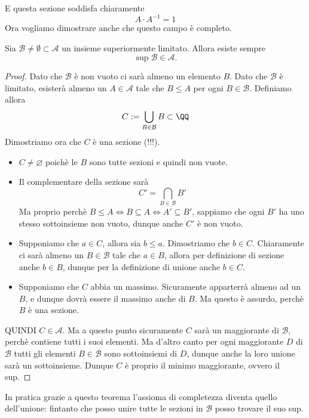 \documentclass[11pt]{scrartcl}
\newcommand{\eset}{\varnothing}
\begin{document}
	E questa sezione soddisfa chiaramente 
	$$A\cdot A^{-1}=1$$
	Ora vogliamo dimostrare anche che questo campo è completo. 
	\begin{theorem}
		Sia $\mathcal{B}\ne\emptyset\subset\mathcal{A}$ un insieme superiormente limitato. Allora esiste sempre $$\sup\mathcal{B}\in\mathcal{A}.$$
	\end{theorem}
	\begin{proof}
		Dato che $\mathcal{B}$ è non vuoto ci sarà almeno un elemento $B$. Dato che $\mathcal{B}$ è limitato, esisterà almeno un $A\in\mathcal{A}$ tale che $B\le A$ per ogni $B\in\mathcal{B}$. Definiamo allora
		$$C:=\bigcup_{B\in\mathcal{B}}B\subset \QQ$$
		Dimostriamo ora che $C$ è una sezione (!!!).
		\begin{itemize}
			\item $C\ne \eset$ poichè le $B$ sono tutte sezioni e quindi non vuote.
			\item Il complementare della sezione sarà
			$$C'=\bigcap_{B\in\mathcal{B}}B'$$
			Ma proprio perchè $B\le A\iff B\subseteq A \iff A'\subseteq B'$, sappiamo che ogni $B'$ ha uno stesso sottoinsieme non vuoto, dunque anche $C'$ è non vuoto.
			\item Supponiamo che $a\in C$, allora sia $b\le a$. Dimostriamo che $b\in C$. Chiaramente ci sarà almeno un $B\in \mathcal{B}$ tale che $a\in B$, allora per definizione di sezione anche $b\in B$, dunque per la definizione di unione anche $b\in C$.
			\item Supponiamo che $C$ abbia un massimo. Sicuramente apparterrà almeno ad un $B$, e dunque dovrà essere il massimo anche di $B$. Ma questo è assurdo, perchè $B$ è una sezione.
		\end{itemize}
		QUINDI $C\in\mathcal{A}$. Ma a questo punto sicuramente $C$ sarà un maggiorante di $\mathcal{B}$, perchè contiene tutti i suoi elementi. Ma d'altro canto per ogni maggiorante $D$ di $\mathcal{B}$ tutti gli elementi $B\in\mathcal{B}$ sono sottoinsiemi di $D$, dunque anche la loro unione sarà un sottoinsieme. Dunque $C$ è proprio il minimo maggiorante, ovvero il sup.
	\end{proof}
	In pratica grazie a questo teorema l'assioma di completezza diventa quello dell'unione: fintanto che posso unire tutte le sezioni in $\mathcal{B}$ posso trovare il suo sup.
	
\end{document}
